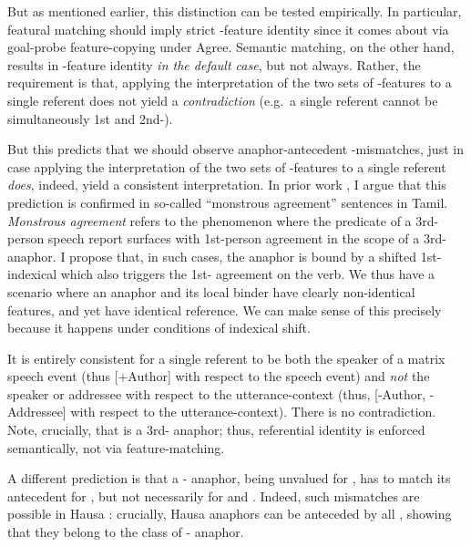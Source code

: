 \documentclass[output=paper, modfonts, nonflat]{langsci/langscibook}
\begin{document}
  But as mentioned earlier, this distinction can be tested
  empirically. In particular, featural matching should imply strict
  \ph-feature identity since it comes about via goal-probe
  feature-copying under Agree. Semantic matching, on the other hand,
  results in \ph-feature identity \emph{in the default case}, but not
  always. Rather, the requirement is that, applying the interpretation
  of the two sets of \ph-features to a single referent does not yield
  a \emph{contradiction} (e.g.\ a single referent cannot be
  simultaneously 1st and 2nd-\person). 

  But this predicts that we should observe anaphor-antecedent
  \ph-mismatches, just in case applying the interpretation of the two
  sets of \ph-features to a single referent \emph{does}, indeed, yield
  a consistent interpretation. In prior work \citep{sundaresan:2012,
    sundaresan:2018}, I argue that this prediction is confirmed in
  so-called ``monstrous agreement'' sentences in Tamil. {\em Monstrous
    agreement} refers to the phenomenon where the predicate of a
  3rd-person speech report surfaces with 1st-person agreement in the
  scope of a 3rd-\person{} anaphor. I propose that, in such cases, the
  anaphor \taan{} is bound by a shifted 1st-\person{} indexical
  \citep{schlenker:2003, anand:2006} which also triggers the
  1st-\person{} agreement on the verb. We thus have a scenario where
  an anaphor and its local binder have clearly non-identical \person{}
  features, and yet have identical reference.  We can make sense of
  this precisely because it happens under conditions of indexical
  shift.
  
  It is entirely consistent for a single referent to be both the
  speaker of a matrix speech event (thus [+Author] with respect to the
  speech event) and \textit{not} the speaker or addressee with respect
  to the utterance-context (thus, [-Author, -Addressee] with respect
  to the utterance-context). There is no contradiction. Note,
  crucially, that \taan{} is a 3rd-\person{} anaphor; thus,
  referential identity is enforced semantically, not via
  feature-matching.
  

  A different prediction is that a \nul-\person{} anaphor, being
  unvalued for \person, has to match its antecedent for \person, but
  not necessarily for \num{} and \gender. Indeed, such \num{}
  mismatches are possible in Hausa \citep[42, 8]{haspelmath:2008}: crucially, Hausa anaphors can be anteceded by
  all \person{} \citep{Newman:2000}, showing that they belong to the
  class of \nul-\person{} anaphor.
\end{document}
